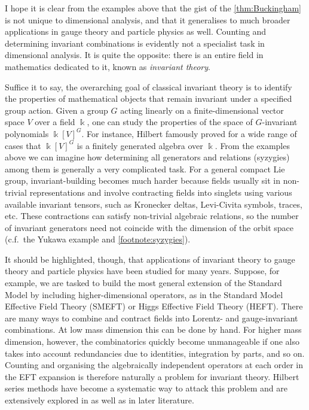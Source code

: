 \documentclass[12pt]{article}
\numberwithin{equation}{section}
\begin{document}
I hope it is clear from the examples above that the gist of the \cref{thm:Buckingham} is not unique to dimensional analysis, and that it generalises to much broader applications in gauge theory and particle physics as well. Counting and determining invariant combinations is evidently not a specialist task in dimensional analysis. It is quite the opposite: there is an entire field in mathematics dedicated to it, known as \emph{invariant theory}.

Suffice it to say, the overarching goal of classical invariant theory is to identify the properties of mathematical objects that remain invariant under a specified group action. Given a group $G$ acting linearly on a finite-dimensional vector space $V$ over a field $\Bbbk$, one can study the properties of the space of $G$-invariant polynomials $\Bbbk[V]^G$. For instance, Hilbert famously proved for a wide range of cases that $\Bbbk[V]^G$ is a finitely generated algebra over $\Bbbk$. From the examples above we can imagine how determining all generators and relations (syzygies) among them is generally a very complicated task. For a general compact Lie group, invariant-building becomes much harder because fields usually sit in non-trivial representations and involve contracting fields into singlets using various available invariant tensors, such as Kronecker deltas, Levi-Civita symbols, traces, etc. These contractions can satisfy non-trivial algebraic relations, so the number of invariant generators need not coincide with the dimension of the orbit space (c.f.~the Yukawa example and \cref{footnote:syzygies}).

It should be highlighted, though, that applications of invariant theory to gauge theory and particle physics have been studied for many years. Suppose, for example, we are tasked to build the most general extension of the Standard Model by including higher-dimensional operators, as in the Standard Model Effective Field Theory (SMEFT) or Higgs Effective Field Theory (HEFT). There are many ways to combine and contract fields into Lorentz- and gauge-invariant combinations. At low mass dimension this can be done by hand. For higher mass dimension, however, the combinatorics quickly become unmanageable if one also takes into account redundancies due to identities, integration by parts, and so on. Counting and organising the algebraically independent operators at each order in the EFT expansion is therefore naturally a problem for invariant theory. Hilbert series methods have become a systematic way to attack this problem and are extensively explored in \citet{Jenkins2009, Hanany2011, LehmanMartin2015, LehmanMartin2016, Henning2016} as well as in later literature. 
\end{document}
